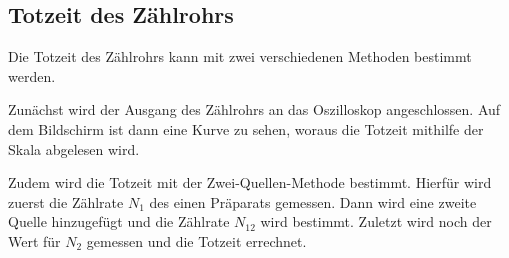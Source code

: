 \subsection{Totzeit des Zählrohrs}
\label{sub:totzeit_durch}

Die Totzeit des Zählrohrs kann mit zwei verschiedenen Methoden bestimmt werden.

Zunächst wird der Ausgang des Zählrohrs an das Oszilloskop angeschlossen.
Auf dem Bildschirm ist dann eine Kurve zu sehen, woraus die Totzeit mithilfe der Skala abgelesen wird.

Zudem wird die Totzeit mit der Zwei-Quellen-Methode bestimmt.
Hierfür wird zuerst die Zählrate $N_1$ des einen Präparats gemessen.
Dann wird eine zweite Quelle hinzugefügt und die Zählrate $N_{12}$ wird bestimmt.
Zuletzt wird noch der Wert für $N_2$ gemessen und die Totzeit errechnet.






